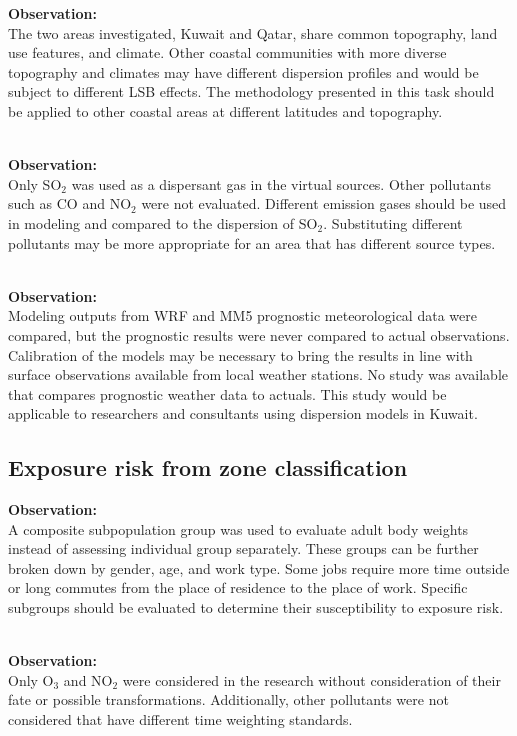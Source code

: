 \noindent
\textbf{Observation:}\\
The two areas investigated, Kuwait and Qatar, share common topography, land use features, and climate. Other coastal communities with more diverse topography and climates may have different dispersion profiles and would be subject to different LSB effects. The methodology presented in this task should be applied to other coastal areas at different latitudes and topography.

\noindent\\
\textbf{Observation:}\\
Only SO$_{2}$ was used as a dispersant gas in the virtual sources. Other pollutants such as CO and NO$_{2}$ were not evaluated. Different emission gases should be used in modeling and compared to the dispersion of SO$_{2}$. Substituting different pollutants may be more appropriate for an area that has different source types.

\noindent\\
\textbf{Observation:}\\
Modeling outputs from WRF and MM5 prognostic meteorological data were compared, but the prognostic results were never compared to actual observations. Calibration of the models may be necessary to bring the results in line with surface observations available from local weather stations. No study was available that compares prognostic weather data to actuals. This study would be applicable to researchers and consultants using dispersion models in Kuwait.

\subsection*{Exposure risk from zone classification}
\noindent
\textbf{Observation:}\\
A composite subpopulation group was used to evaluate adult body weights instead of assessing individual group separately. These groups can be further broken down by gender, age, and work type. Some jobs require more time outside or long commutes from the place of residence to the place of work. Specific subgroups should be evaluated to determine their susceptibility to exposure risk.

\noindent\\
\textbf{Observation:}\\
Only O$_{3}$ and NO$_{2}$ were considered in the research without consideration of their fate or possible transformations. Additionally, other pollutants were not considered that have different time weighting standards. 

